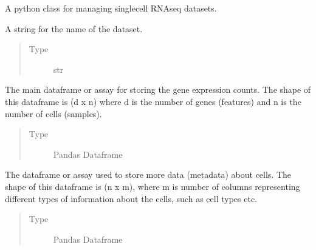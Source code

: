\documentclass[letterpaper,10pt,english]{sphinxmanual}
\begin{document}
\begin{fulllineitems}
\label{\detokenize{index:singlecelldata.SingleCell}}
A python class for managing single\sphinxhyphen{}cell RNA\sphinxhyphen{}seq datasets.

\begin{fulllineitems}
\label{\detokenize{index:singlecelldata.SingleCell.dataset}}
A string for the name of the dataset.
\begin{quote}\begin{description}
\item[{Type}] \leavevmode
str

\end{description}\end{quote}

\end{fulllineitems}


\begin{fulllineitems}
\label{\detokenize{index:singlecelldata.SingleCell.data}}
The main dataframe or assay for storing the gene expression counts. The shape of this
dataframe is (d x n) where d is the number of genes (features) and n is the
number of cells (samples).
\begin{quote}\begin{description}
\item[{Type}] \leavevmode
Pandas Dataframe

\end{description}\end{quote}

\end{fulllineitems}


\begin{fulllineitems}
\label{\detokenize{index:singlecelldata.SingleCell.celldata}}
The dataframe or assay used to store more data (metadata) about cells. The shape of this dataframe
is (n x m), where m is number of columns representing different types of information
about the cells, such as cell types etc.
\begin{quote}\begin{description}
\item[{Type}] \leavevmode
Pandas Dataframe


\end{description}
\end{quote}
\end{fulllineitems}
\end{fulllineitems}
\end{document}

